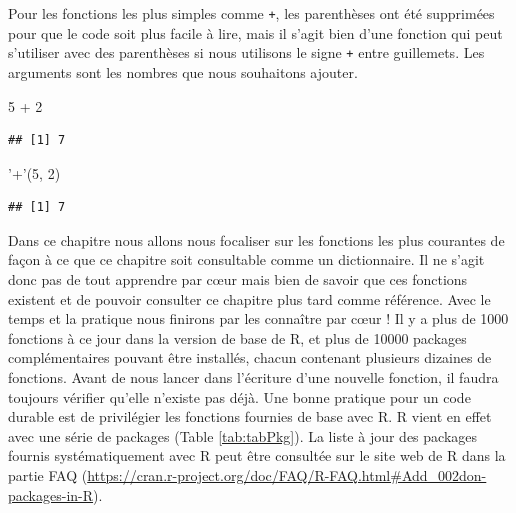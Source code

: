 \documentclass[twoside,symmetric]{book}
\newenvironment{Shaded}{}{}
\newcommand{\DecValTok}[1]{#1}
\newcommand{\NormalTok}[1]{#1}
\newcommand{\OperatorTok}[1]{#1}
\newcommand{\StringTok}[1]{#1}
\begin{document}
Pour les fonctions les plus simples comme \texttt{+}, les parenthèses ont été supprimées pour que le code soit plus facile à lire, mais il s'agit bien d'une fonction qui peut s'utiliser avec des parenthèses si nous utilisons le signe \texttt{+} entre guillemets. Les arguments sont les nombres que nous souhaitons ajouter.

\begin{Shaded}
\begin{Highlighting}[]
\DecValTok{5} \OperatorTok{+}\StringTok{ }\DecValTok{2}
\end{Highlighting}
\end{Shaded}

\begin{verbatim}
## [1] 7
\end{verbatim}

\begin{Shaded}
\begin{Highlighting}[]
\StringTok{'+'}\NormalTok{(}\DecValTok{5}\NormalTok{, }\DecValTok{2}\NormalTok{)}
\end{Highlighting}
\end{Shaded}

\begin{verbatim}
## [1] 7
\end{verbatim}

Dans ce chapitre nous allons nous focaliser sur les fonctions les plus courantes de façon à ce que ce chapitre soit consultable comme un dictionnaire. Il ne s'agit donc pas de tout apprendre par cœur mais bien de savoir que ces fonctions existent et de pouvoir consulter ce chapitre plus tard comme référence. Avec le temps et la pratique nous finirons par les connaître par cœur ! Il y a plus de 1000 fonctions à ce jour dans la version de base de R, et plus de 10000 packages complémentaires pouvant être installés, chacun contenant plusieurs dizaines de fonctions. Avant de nous lancer dans l'écriture d'une nouvelle fonction, il faudra toujours vérifier qu'elle n'existe pas déjà. Une bonne pratique pour un code durable est de privilégier les fonctions fournies de base avec R. R vient en effet avec une série de packages (Table \ref{tab:tabPkg}). La liste à jour des packages fournis systématiquement avec R peut être consultée sur le site web de R dans la partie FAQ (\url{https://cran.r-project.org/doc/FAQ/R-FAQ.html\#Add_002don-packages-in-R}).
\end{document}
